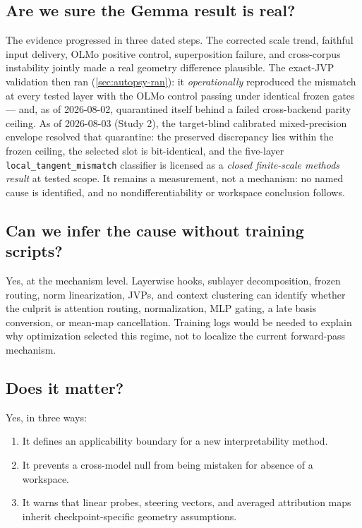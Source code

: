 \documentclass[11pt]{article}
\theoremstyle{definition}
\theoremstyle{remark}
\begin{document}
\subsection{Are we sure the Gemma result is real?}
The evidence progressed in three dated steps. The corrected scale trend, faithful input delivery, OLMo positive control, superposition failure, and cross-corpus instability jointly made a real geometry difference plausible. The exact-JVP validation then ran (\cref{sec:autopsy-ran}): it \emph{operationally} reproduced the mismatch at every tested layer with the OLMo control passing under identical frozen gates --- and, as of 2026-08-02, quarantined itself behind a failed cross-backend parity ceiling. As of 2026-08-03 (Study 2), the target-blind calibrated mixed-precision envelope resolved that quarantine: the preserved discrepancy lies within the frozen ceiling, the selected slot is bit-identical, and the five-layer \texttt{local\_tangent\_mismatch} classifier is licensed as a \emph{closed finite-scale methods result} at tested scope. It remains a measurement, not a mechanism: no named cause is identified, and no nondifferentiability or workspace conclusion follows.

\subsection{Can we infer the cause without training scripts?}
Yes, at the mechanism level. Layerwise hooks, sublayer decomposition, frozen routing, norm linearization, JVPs, and context clustering can identify whether the culprit is attention routing, normalization, MLP gating, a late basis conversion, or mean-map cancellation. Training logs would be needed to explain why optimization selected this regime, not to localize the current forward-pass mechanism.

\subsection{Does it matter?}
Yes, in three ways:
\begin{enumerate}
  \item It defines an applicability boundary for a new interpretability method.
  \item It prevents a cross-model null from being mistaken for absence of a workspace.
  \item It warns that linear probes, steering vectors, and averaged attribution maps inherit checkpoint-specific geometry assumptions.
\end{enumerate}
\end{document}
